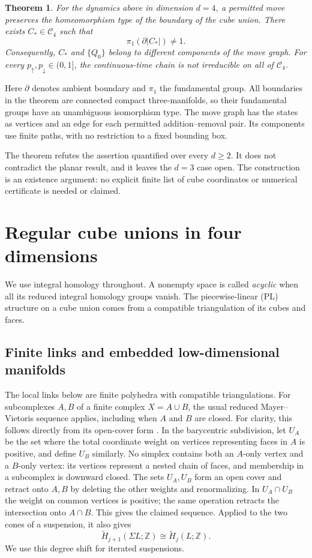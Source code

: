 \documentclass[11pt]{article}
\newtheorem{theorem}{Theorem}[section]
\theoremstyle{remark}
\newcommand{\Cl}{\mathcal C}
\newcommand{\Z}{\mathbb Z}
\newcommand{\bd}{\partial}
\newcommand{\Ht}{\widetilde H}
\begin{document}
\begin{theorem}\label{thm:main}
For the dynamics above in dimension $d=4$, a permitted move preserves the
homeomorphism type of the boundary of the cube union. There exists
$C_*\in\Cl_4$ such that
\[
 \pi_1(\bd|C_*|)\neq1.
\]
Consequently, $C_*$ and $\{Q_0\}$ belong to different components of the
move graph. For every $p_\uparrow,p_\downarrow\in(0,1]$, the continuous-time
chain is not irreducible on all of $\Cl_4$.
\end{theorem}

Here $\bd$ denotes ambient boundary and $\pi_1$ the fundamental group.
All boundaries in the theorem are connected compact three-manifolds, so
their fundamental groups have an unambiguous isomorphism type. The move
graph has the states as vertices and an edge for each permitted
addition--removal pair. Its components use finite paths, with no restriction
to a fixed bounding box.

The theorem refutes the assertion quantified over every $d\geq2$. It does
not contradict the planar result, and it leaves the $d=3$ case open. The
construction is an existence argument: no explicit finite list of cube
coordinates or numerical certificate is needed or claimed.

\section{Regular cube unions in four dimensions}

We use integral homology throughout. A nonempty space is called
\emph{acyclic} when all its reduced integral homology groups vanish.
The piecewise-linear (PL) structure on a cube union comes from a compatible
triangulation of its cubes and faces.

\subsection{Finite links and embedded low-dimensional manifolds}

The local links below are finite polyhedra with compatible triangulations.
For subcomplexes $A,B$ of a finite complex $X=A\cup B$, the usual reduced
Mayer--Vietoris sequence applies, including when $A$ and $B$ are closed.
For clarity, this follows directly from its open-cover form
\cite[pp.~149--151]{Hatcher}. In the barycentric subdivision, let $U_A$
be the set where the total coordinate weight on vertices representing
faces in $A$ is positive, and define $U_B$ similarly. No simplex contains
both an $A$-only vertex and a $B$-only vertex: its vertices represent a
nested chain of faces, and membership in a subcomplex is downward closed.
The sets $U_A,U_B$ form an open cover and retract onto $A,B$ by deleting
the other weights and renormalizing. In $U_A\cap U_B$ the weight on common
vertices is positive; the same operation retracts the intersection onto
$A\cap B$. This gives the claimed sequence. Applied to the two cones
of a suspension, it also gives
\begin{equation}\label{eq:suspension}
 \Ht_{j+1}(\Sigma L;\Z)\cong\Ht_j(L;\Z).
\end{equation}
We use this degree shift for iterated suspensions.
\end{document}
